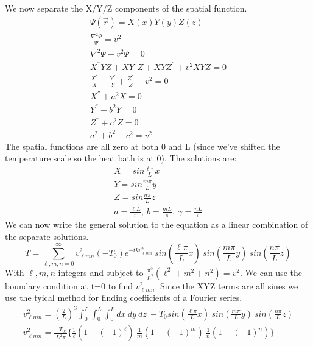 \documentclass[a4paper,10pt]{article}
\numberwithin{equation}{section}
\begin{document}
We now separate the X/Y/Z components of the spatial function.
\begin{gather}
\Psi (\vec{r})=X(x)Y(y)Z(z)\\
\frac{\nabla ^2\Psi}{\Psi}=v^2\\
\nabla ^2\Psi -v^2 \Psi =0\\
X^{''} YZ+XY^{''} Z+XYZ^{''} +v^2XYZ=0\\
\frac{X^{''} }{X}+\frac{Y^{''} }{Y}+\frac{Z^{''} }{Z}-v^2=0\\
X^{''} +a^2 X=0\\
Y^{''} +b^2 Y=0\\
Z^{''} +c^2 Z=0\\
a^2+b^2+c^2=v^2
\end{gather}
The spatial functions are all zero at both 0 and L (since we've shifted the temperature scale so the heat bath is at 0).
The solutions are:
\begin{gather}
X=sin\frac{\ell \pi}{L}x\\
Y=sin\frac{m\pi}{L}y\\
Z=sin\frac{n \pi}{L}z\\
a=\frac{\ell L}{\pi},\ b=\frac{mL}{\pi},\ \gamma=\frac{nL}{\pi}
\end{gather}
We can now write the general solution to the equation as a linear combination of the separate solutions.
\begin{equation}
T=\sum _{\ell,m,n=0}^{\infty}v^2_{\ell mn}(-T_0)e^{-tkv_{\ell mn}^{2}}\ sin(\frac{\ell \pi}{L}x)\ sin(\frac{m \pi}{L}y)\ sin(\frac{n \pi}{L}z)
\end{equation}
With $\ell, m, n$ integers and subject to $\frac{\pi^2}{L^2}(\ell^2+m^2+n^2)=v^2$. 
We can use the boundary condition at t=0 to find $v^2_{\ell mn}$. 
Since the XYZ terms are all sines we use the tyical method for finding coefficients of a Fourier series.
\begin{gather}
 v^2_{\ell mn}=(\frac{2}{L})^3 \int_0^L \int_0^L \int_0^L dx\ dy\ dz\ -T_0sin(\frac{\ell \pi}{L}x)\ sin(\frac{m\pi}{L}y)\ sin(\frac{n \pi}{L}z)\\ 
 v^2_{\ell mn}=\frac{-T_08}{L^2 \pi}\{\frac{1}{\ell}(1-(-1)^\ell )\ \frac{1}{m}(1-(-1)^m )\ \frac{1}{n}(1-(-1)^n) \} 
\end{gather}
\end{document}
